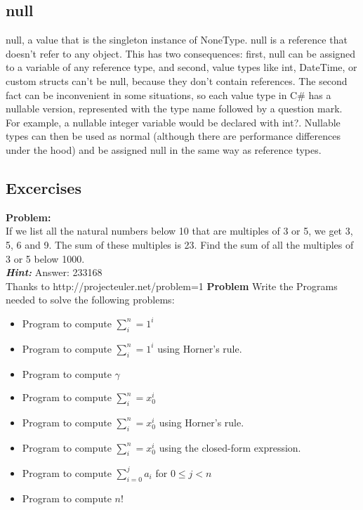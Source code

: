 \documentclass[12pt,a4paper,final,twoside,onecolumn,titlepage]{book}
\begin{document}
\subsection{null}
null, a value that is the singleton instance of NoneType. null is a reference that doesn’t refer to any object. This has two consequences: first, null can be assigned to a variable of any reference type, and second, value types like int, DateTime, or custom structs can’t be null, because they don’t contain references.
The second fact can be inconvenient in some situations, so each value type in C\# has a nullable version, represented with the type name followed by a question mark. For example, a nullable integer variable would be declared with int?. Nullable types can then be used as normal (although there are performance differences under the hood) and be assigned null in the same way as reference types.
\subsection{Excercises}
\textbf{Problem:}\\
If we list all the natural numbers below 10 that are multiples of 3 or 5, we get 3, 5, 6 and 9. The sum of these multiples is 23.
Find the sum of all the multiples of 3 or 5 below 1000.\\
\textbf{\textit{Hint:}} Answer: 233168\\
Thanks to http://projecteuler.net/problem=1
\textbf{Problem}
Write the Programs needed to solve the following problems:
\begin{itemize}
\item Program to compute $\sum_{i}^{n}=1^{i}$
\item Program to compute $\sum_{i}^{n}=1^{i}$ using Horner's rule.
\item Program to compute $\gamma$
\item Program to compute $\sum_{i}^{n}=x_{0}^{i}$
\item Program to compute $\sum_{i}^{n}=x_{0}^{i}$ using Horner's rule.
\item Program to compute $\sum_{i}^{n}=x_{0}^{i}$ using the closed-form expression.
\item Program to compute $\sum_{i=0}^{j}a_{i}$ for $0\leq j<n$
\item Program to compute $n!$
\end{itemize}




\newpage
\printglossary[style=altlist,title=Glossary]
\end{document}
